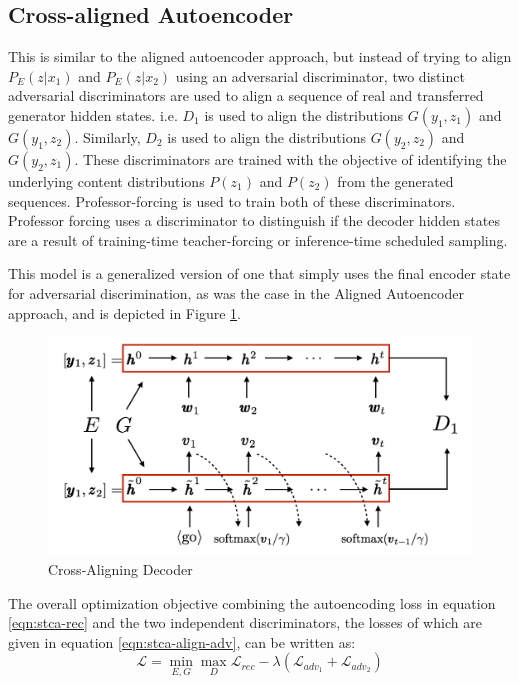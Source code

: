 \subsection{Cross-aligned Autoencoder}

This is similar to the aligned autoencoder approach, but instead of trying to align $P_E(z|x_1)$ and $P_E(z|x_2)$ using an adversarial discriminator, two distinct adversarial discriminators are used to align a sequence of real and transferred generator hidden states. i.e. $D_1$ is used to align the distributions $G(y_1, z_1)$ and $G(y_1, z_2)$. Similarly, $D_2$ is used to align the distributions $G(y_2, z_2)$ and $G(y_2, z_1)$. These discriminators are trained with the objective of identifying the underlying content distributions $P(z_1)$ and $P(z_2)$ from the generated sequences. Professor-forcing \citep{lamb2016professor} is used to train both of these discriminators. Professor forcing uses a discriminator to distinguish if the decoder hidden states are a result of training-time teacher-forcing or inference-time scheduled sampling.

This model is a generalized version of one that simply uses the final encoder state for adversarial discrimination, as was the case in the Aligned Autoencoder approach, and is depicted in Figure \ref{fig:stca-cross-align}.

\begin{figure}[ht]
	\centering
	\includegraphics[width=\textwidth]{images/stca-cross-align}
	\caption{\label{fig:stca-cross-align} Cross-Aligning Decoder}
\end{figure}

The overall optimization objective combining the autoencoding loss in equation \ref{eqn:stca-rec} and the two independent discriminators, the losses of which are given in equation \ref{eqn:stca-align-adv}, can be written as:
\begin{equation}
	\mathcal{L} = \operatorname*{min}_{E,G} \operatorname*{max}_{D} \mathcal{L}_{rec} - \lambda (\mathcal{L}_{adv_1} + \mathcal{L}_{adv_2})
\end{equation}

